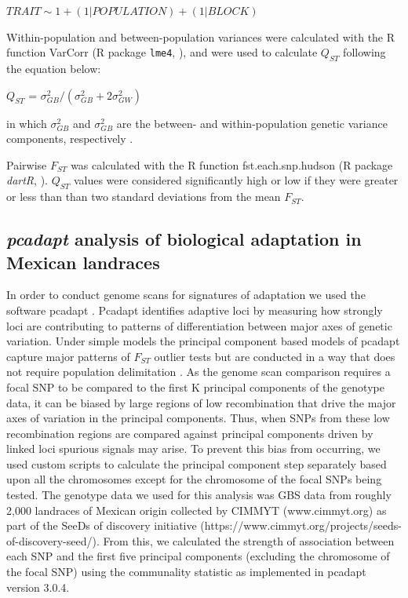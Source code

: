 \documentclass[9pt,twocolumn,twoside]{BioRxiv}
\begin{document}
\begin{center}
${ TRAIT \sim 1 + (1|POPULATION) + (1|BLOCK) }$
\end{center}

Within-population and between-population variances were calculated with the R function VarCorr (R package \texttt{lme4}, \citealp{bates2014lme4}), and were used to calculate $Q_{ST}$ following the equation below:

\begin{center}
$Q_{ST}$ = \(\sigma^{2}_{GB}/(\sigma^{2}_{GB}+2\sigma^{2}_{GW})\)
\end{center}

\noindent in which $\sigma^{2}_{GB}$ and $\sigma^{2}_{GB}$ are the between- and within-population genetic variance components, respectively \citep{Leinonen2013-ic}.

Pairwise $F_{ST}$ was calculated with the R function fst.each.snp.hudson (R package \textit{dartR}, \citealp{gruber2018dartr}).
$Q_{ST}$ values were considered significantly high or low if they were greater or less than than two standard deviations from the mean $F_{ST}$.


\subsection{\textit{pcadapt} analysis of biological adaptation in Mexican landraces}

In order to conduct genome scans for signatures of adaptation we used the software pcadapt \citep{Luu2017-ws}.
Pcadapt identifies adaptive loci by measuring how strongly loci are contributing to patterns of differentiation between major axes of genetic variation.
Under simple models the principal component based models of pcadapt capture major patterns of $F_{ST}$ outlier tests but are conducted in a way that does not require population delimitation \citep{duforet2014genome}.
As the genome scan comparison requires a focal SNP to be compared to the first K principal components of the genotype data, it can be biased by large regions of low recombination that drive the major axes of variation in the principal components.
Thus, when SNPs from these low recombination regions are compared against principal components driven by linked loci spurious signals may arise.
To prevent this bias from occurring, we used custom scripts to calculate the principal component step separately based upon all the chromosomes except for the chromosome of the focal SNPs being tested.
The genotype data we used for this analysis was GBS data from roughly 2,000 landraces of Mexican origin collected by CIMMYT (www.cimmyt.org) as part of the SeeDs of discovery initiative (https://www.cimmyt.org/projects/seeds-of-discovery-seed/).
From this, we calculated the strength of association between each SNP and the first five principal components (excluding the chromosome of the focal SNP) using the communality statistic as implemented in pcadapt version 3.0.4.
\end{document}
